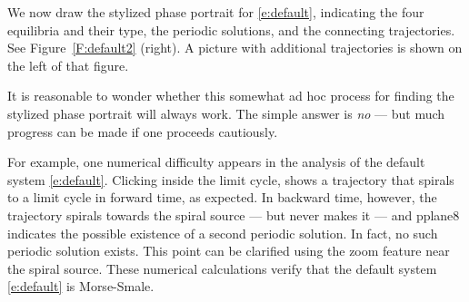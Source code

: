 \documentclass{ximera}
\begin{document}
We now draw the stylized phase portrait
 for \eqref{e:default},
indicating the four equilibria and their type, the periodic
solutions, and the connecting trajectories. See
Figure~\ref{F:default2} (right).  A picture with additional 
trajectories is shown on the left of that figure.

\begin{figure*}[htb]
           \centerline{%
		}
           \caption{(Left) Additional trajectories of 
\protect\eqref{e:default}. (Right) Stylized phase portrait
indicating equilibria, periodic solutions and connecting trajectories.}
           \label{F:default2}
\end{figure*}

It is reasonable to wonder whether this somewhat ad hoc process
for finding the stylized phase portrait will always work.  The
simple answer is {\em no} --- but much progress can be made if
one proceeds cautiously.  

For example, one numerical difficulty appears in the analysis of
the default system \eqref{e:default}.  Clicking inside the limit
cycle, shows a trajectory that spirals to a limit cycle in
forward time, as expected. In backward time, however, the
trajectory spirals towards the spiral source --- but never makes
it --- and {\sf pplane8} indicates the possible existence of a
second periodic solution.  In fact, no such periodic solution
exists. This point can be clarified using the zoom feature near
the spiral source.  These numerical calculations verify that the 
default system \eqref{e:default} is Morse-Smale.

\EXER

\CEXER
\end{document}
